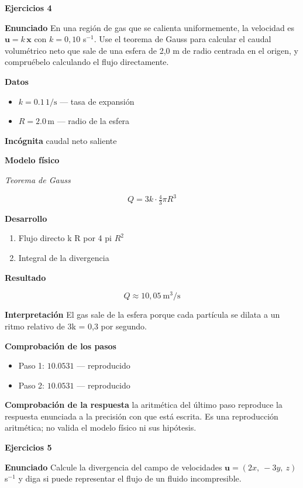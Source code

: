 \documentclass[10pt,openany]{book}
\begin{document}
\noindent\textbf{Ejercicios 4}

\noindent\textbf{Enunciado}
En una región de gas que se calienta uniformemente, la velocidad es \(\mathbf{u} = k\,\mathbf{x}\) con \(k = 0{,}10\) s\(^{-1}\). Use el teorema de Gauss para calcular el caudal volumétrico neto que sale de una esfera de 2,0 m de radio centrada en el origen, y compruébelo calculando el flujo directamente.

\noindent\textbf{Datos}
\begin{itemize}
\item $k = 0.1\,\mathrm{1/s}$ — tasa de expansión
\item $R = 2.0\,\mathrm{m}$ — radio de la esfera
\end{itemize}

\noindent\textbf{Incógnita}
caudal neto saliente

\noindent\textbf{Modelo físico}

\noindent\textit{Teorema de Gauss}

\[
Q = 3k\cdot\tfrac43\pi R^{3}
\]

\noindent\textbf{Desarrollo}
\begin{enumerate}
\item
Flujo directo k R por 4 pi \(R^2\)
\item
Integral de la divergencia
\end{enumerate}

\noindent\textbf{Resultado}

\[
Q \approx 10{,}05\ \mathrm{m^{3}/s}
\]

\noindent\textbf{Interpretación}
El gas sale de la esfera porque cada partícula se dilata a un ritmo relativo de 3k = 0,3 por segundo.

\noindent\textbf{Comprobación de los pasos}
\begin{itemize}
\item Paso 1: $10.0531$ — reproducido
\item Paso 2: $10.0531$ — reproducido
\end{itemize}

\noindent\textbf{Comprobación de la respuesta} la aritmética del último paso reproduce la respuesta enunciada a la precisión con que está escrita. Es una reproducción aritmética; no valida el modelo físico ni sus hipótesis.

\noindent\textbf{Ejercicios 5}

\noindent\textbf{Enunciado}
Calcule la divergencia del campo de velocidades \(\mathbf{u} = (2x,\ -3y,\ z)\) s\(^{-1}\) y diga si puede representar el flujo de un fluido incompresible.
\end{document}

